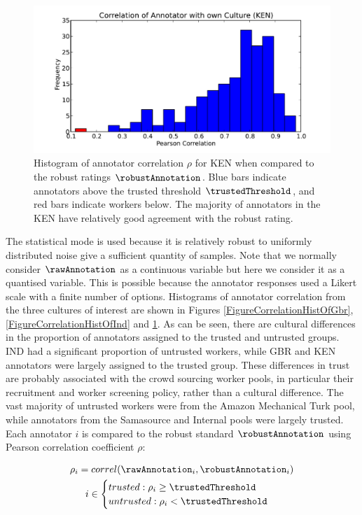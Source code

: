\begin{figure}
\centering
\includegraphics[width = 0.6 \columnwidth]{annotation/correlken.pdf}
\caption{Histogram of annotator correlation $\rho$ for KEN when compared to the robust ratings $\robustAnnotation$. Blue bars indicate annotators above the trusted threshold $\trustedThreshold$, and red bars indicate workers below. The majority of annotators in the KEN have relatively good agreement with the robust rating.}
\label{FigureCorrelationHistOfKen}
\end{figure}

The statistical mode is used because it is relatively robust to uniformly distributed noise give a sufficient quantity of samples. Note that we normally consider $\rawAnnotation$ as a continuous variable but here we consider it as a quantised variable. This is possible because the annotator responses used a Likert scale with a finite number of options. Histograms of annotator correlation from the three cultures of interest are shown in Figures \ref{FigureCorrelationHistOfGbr}, \ref{FigureCorrelationHistOfInd} and \ref{FigureCorrelationHistOfKen}. As can be seen, there are cultural differences in the proportion of annotators assigned to the trusted and untrusted groups. IND had a significant proportion of untrusted workers, while GBR and KEN annotators were largely assigned to the trusted group. These differences in trust are probably associated with the crowd sourcing worker pools, in particular their recruitment and worker screening policy, rather than a cultural difference. The vast majority of untrusted workers were from the Amazon Mechanical Turk pool, while annotators from the Samasource and Internal pools were largely trusted. Each annotator $i$ is compared to the robust standard $\robustAnnotation$ using Pearson correlation coefficient $\rho$:

\begin{gather}
\rho_i = correl(\rawAnnotation_i,\robustAnnotation_i) \\
i \in \begin{cases}
trusted : \rho_i \ge \trustedThreshold \\
untrusted : \rho_i < \trustedThreshold
\end{cases}
\end{gather}

